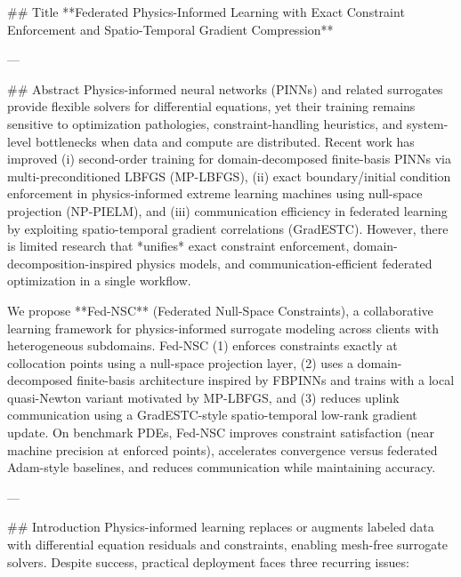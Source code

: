 ## Title  
**Federated Physics-Informed Learning with Exact Constraint Enforcement and Spatio-Temporal Gradient Compression**

---

## Abstract  
Physics-informed neural networks (PINNs) and related surrogates provide flexible solvers for differential equations, yet their training remains sensitive to optimization pathologies, constraint-handling heuristics, and system-level bottlenecks when data and compute are distributed. Recent work has improved (i) second-order training for domain-decomposed finite-basis PINNs via multi-preconditioned LBFGS (MP-LBFGS), (ii) exact boundary/initial condition enforcement in physics-informed extreme learning machines using null-space projection (NP-PIELM), and (iii) communication efficiency in federated learning by exploiting spatio-temporal gradient correlations (GradESTC). However, there is limited research that *unifies* exact constraint enforcement, domain-decomposition-inspired physics models, and communication-efficient federated optimization in a single workflow.  

We propose **Fed-NSC** (Federated Null-Space Constraints), a collaborative learning framework for physics-informed surrogate modeling across clients with heterogeneous subdomains. Fed-NSC (1) enforces constraints exactly at collocation points using a null-space projection layer, (2) uses a domain-decomposed finite-basis architecture inspired by FBPINNs and trains with a local quasi-Newton variant motivated by MP-LBFGS, and (3) reduces uplink communication using a GradESTC-style spatio-temporal low-rank gradient update. On benchmark PDEs, Fed-NSC improves constraint satisfaction (near machine precision at enforced points), accelerates convergence versus federated Adam-style baselines, and reduces communication while maintaining accuracy.

---

## Introduction  
Physics-informed learning replaces or augments labeled data with differential equation residuals and constraints, enabling mesh-free surrogate solvers. Despite success, practical deployment faces three recurring issues:

